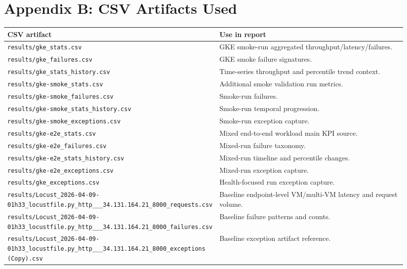 \documentclass[11pt,a4paper]{article}
\begin{document}
\section*{Appendix B: CSV Artifacts Used}
\begin{longtable}{p{0.45\linewidth}p{0.49\linewidth}}
\toprule
\textbf{CSV artifact} & \textbf{Use in report} \\
\midrule
\endhead
\texttt{results/gke\_stats.csv} & GKE smoke-run aggregated throughput/latency/failures. \\
\texttt{results/gke\_failures.csv} & GKE smoke failure signatures. \\
\texttt{results/gke\_stats\_history.csv} & Time-series throughput and percentile trend context. \\
\texttt{results/gke-smoke\_stats.csv} & Additional smoke validation run metrics. \\
\texttt{results/gke-smoke\_failures.csv} & Smoke-run failures. \\
\texttt{results/gke-smoke\_stats\_history.csv} & Smoke-run temporal progression. \\
\texttt{results/gke-smoke\_exceptions.csv} & Smoke-run exception capture. \\
\texttt{results/gke-e2e\_stats.csv} & Mixed end-to-end workload main KPI source. \\
\texttt{results/gke-e2e\_failures.csv} & Mixed-run failure taxonomy. \\
\texttt{results/gke-e2e\_stats\_history.csv} & Mixed-run timeline and percentile changes. \\
\texttt{results/gke-e2e\_exceptions.csv} & Mixed-run exception capture. \\
\texttt{results/gke\_exceptions.csv} & Health-focused run exception capture. \\
\texttt{results/Locust\_2026-04-09-01h33\_locustfile.py\_http\_\_\_34.131.164.21\_8000\_requests.csv} & Baseline endpoint-level VM/multi-VM latency and request volume. \\
\texttt{results/Locust\_2026-04-09-01h33\_locustfile.py\_http\_\_\_34.131.164.21\_8000\_failures.csv} & Baseline failure patterns and counts. \\
\texttt{results/Locust\_2026-04-09-01h33\_locustfile.py\_http\_\_\_34.131.164.21\_8000\_exceptions (Copy).csv} & Baseline exception artifact reference. \\
\bottomrule
\end{longtable}
\end{document}
